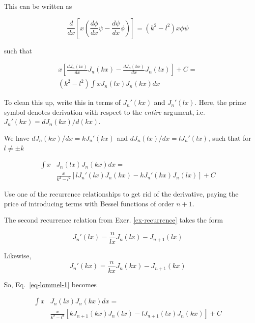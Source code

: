 This can be written as

\begin{equation}
\frac{d}{dx}\left[x \left( \frac{d \phi}{dx} \psi - \frac{d \psi}{dx} \phi\right)\right] = \left(k^2 - l^2\right) x \phi \psi
\end{equation}

such that

\begin{align}
x \left[{\frac{dJ_n(lx)}{dx}  J_n(kx) - \frac{dJ_n(kx)}{dx} J_n(lx)}\right] + C = \nonumber \\ \left(k^2 - l^2\right)\int x J_n(lx)J_n(kx)dx
\end{align}

\begin{cue}
To clean this up, write this in terms of $J_n'(kx)$ and  $J_n'(lx)$. Here, the prime symbol denotes derivation with respect to the \emph{entire} argument, i.e. $J_n'(kx)=dJ_n(kx)/d(kx)$. 
\end{cue}

We have $dJ_n(kx)/dx = kJ_n'(kx)$ and $dJ_n(lx)/dx = lJ_n'(lx)$, such that for $l \ne \pm k$

\begin{align}
  \int x & J_n(lx)J_n(kx)dx = \nonumber \\
  & \frac{x}{k^2 - l^2} \left[{l J_n'(lx) J_n(kx) - k J_n'(kx) J_n(lx)}\right] + C \label{eq-lommel-1}
\end{align} 

\begin{cue}
Use one of the recurrence relationships to get rid of the derivative, paying the price of introducing terms with Bessel functions of order $n+1$.
\end{cue}

The second recurrence relation from Exer. \ref{ex-recurrence} takes the form

\begin{equation}
J_n'(lx) =  \frac{n}{lx}J_n(lx)-J_{n+1}(lx)
\end{equation} 

Likewise,
\begin{equation}
J_n'(kx) =  \frac{n}{kx}J_n(kx)-J_{n+1}(kx)
\end{equation} 

So, Eq.~\ref{eq-lommel-1} becomes

\begin{align}
  \int x & J_n(lx)J_n(kx)dx = \nonumber \\
  & \frac{x}{k^2 - l^2} \left[{k J_{n+1}(kx) J_n(lx) - l J_{n+1}(lx) J_n(kx)}\right] + C \label{eq-lommel-2}
\end{align} 

